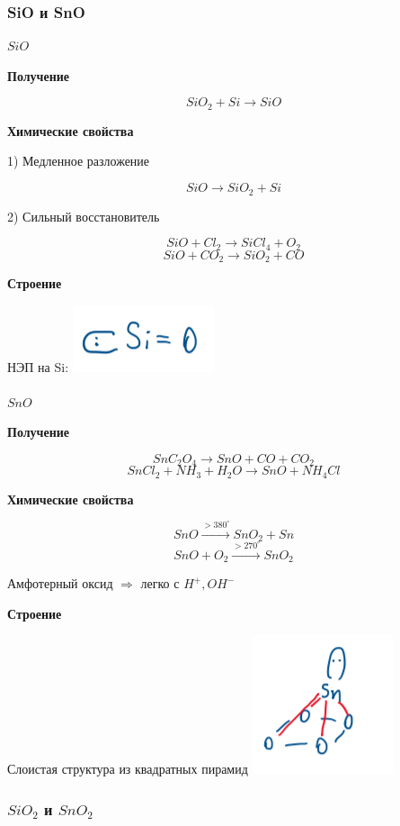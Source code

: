 \subsubsection*{SiO и SnO}


$SiO$

\textbf{Получение}

$$SiO_2 + Si \rightarrow SiO$$

\textbf{Химические свойства}

1) Медленное разложение

$$SiO \rightarrow SiO_2 + Si$$

2) Сильный восстановитель

$$SiO + Cl_2 \rightarrow SiCl_4 + O_2$$
$$SiO + CO_2 \rightarrow SiO_2 + CO$$

\textbf{Строение}

НЭП на Si: \includegraphics{images/10v4.png}\\
\\
$SnO$

\textbf{Получение}

$$SnC_2O_4 \rightarrow SnO + CO + CO_2$$
$$SnCl_2 + NH_3 + H_2O \rightarrow SnO + NH_4Cl$$

\textbf{Химические свойства}

$$SnO \xrightarrow{>380^{\circ}} SnO_2 + Sn$$
$$SnO + O_2 \xrightarrow{>270^{\circ}} SnO_2$$

Амфотерный оксид $\Rightarrow$ легко с $H^+, OH^-$

\textbf{Строение}

Слоистая структура из квадратных пирамид
\includegraphics{images/10v5.png}

\subsubsection*{$SiO_2$ и $SnO_2$}

